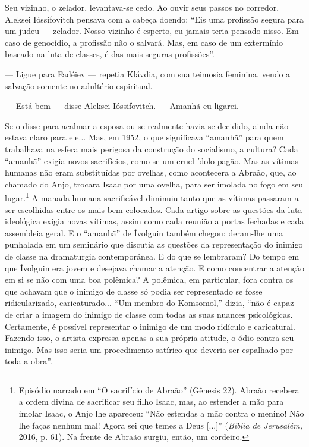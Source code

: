 Seu vizinho, o zelador, levantava-se cedo. Ao ouvir seus passos no
corredor, Aleksei Ióssifovitch pensava com a cabeça doendo: ``Eis uma
profissão segura para um judeu --- zelador. Nosso vizinho é esperto, eu
jamais teria pensado nisso. Em caso de genocídio, a profissão não o
salvará. Mas, em caso de um extermínio baseado na luta de classes, é das
mais seguras profissões''.

--- Ligue para Fadéiev --- repetia Klávdia, com sua teimosia feminina,
vendo a salvação somente no adultério espiritual.

--- Está bem --- disse Aleksei Ióssifovitch. --- Amanhã eu ligarei.

Se o disse para acalmar a esposa ou se realmente havia se decidido,
ainda não estava claro para ele... Mas, em 1952, o que significava
``amanhã'' para quem trabalhava na esfera mais perigosa da construção do
socialismo, a cultura? Cada ``amanhã'' exigia novos sacrifícios, como se
um cruel ídolo pagão. Mas as vítimas humanas não eram substituídas por
ovelhas, como acontecera a Abraão, que, ao chamado do Anjo, trocara
Isaac por uma ovelha, para ser imolada no fogo em seu lugar.\footnote{Episódio
  narrado em ``O sacrifício de Abraão'' (Gênesis 22). Abraão recebera a
  ordem divina de sacrificar seu filho Isaac, mas, ao estender a mão
  para imolar Isaac, o Anjo lhe apareceu: ``Não estendas a mão contra o
  menino! Não lhe faças nenhum mal! Agora sei que temes a Deus
  {[}...{]}'' (\emph{Bíblia de Jerusalém,} 2016, p. 61). Na frente de
  Abraão surgiu, então, um cordeiro.} A manada humana sacrificável
diminuiu tanto que as vítimas passaram a ser escolhidas entre os mais
bem colocados. Cada artigo sobre as questões da luta ideológica exigia
novas vítimas, assim como cada reunião a portas fechadas e cada
assembleia geral. E o ``amanhã'' de Ívolguin também chegou: deram-lhe
uma punhalada em um seminário que discutia as questões da representação
do inimigo de classe na dramaturgia contemporânea. E do que se
lembraram? Do tempo em que Ívolguin era jovem e desejava chamar a
atenção. E como concentrar a atenção em si se não com uma boa polêmica?
A polêmica, em particular, fora contra os que achavam que o inimigo de
classe só podia ser representado se fosse ridicularizado,
caricaturado... ``Um membro do Komsomol,'' dizia, ``não é capaz de criar
a imagem do inimigo de classe com todas as suas nuances psicológicas.
Certamente, é possível representar o inimigo de um modo ridículo e
caricatural. Fazendo isso, o artista expressa apenas a sua própria
atitude, o ódio contra seu inimigo. Mas isso seria um procedimento
satírico que deveria ser espalhado por toda a obra''.

